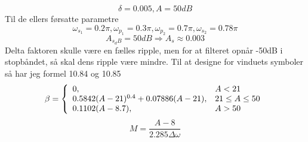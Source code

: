 \begin{Øvelser}
\begin{kapitel}
\begin{Øvelse}
            \[\delta = 0.005, A = 50dB\]
            Til de ellers førsatte parametre 
            \[\omega_{s_1} = 0.2\pi, \omega_{p_1} = 0.3\pi, \omega_{p_2} = 0.7\pi, \omega_{s_2} = 0.78\pi\]
            \[A_{s_dB}= 50dB \Rightarrow A_s \approx 0.003\]
            Delta faktoren skulle være en fælles ripple, men for at filteret opnår -50dB i stopbåndet, så skal dens ripple være mindre.
            Til at designe for vinduets symboler så har jeg formel 10.84 og 10.85
            \[\beta=\left\{\begin{array}{l l}{{0,}}&{{A<21}}\\ {{0.5842(A-21)^{0.4}+0.07886(A-21),}}&{{21\leq A\leq50}}\\ {{0.1102(A-8.7),}}&{{A>50}}\end{array}\right.\]
            \[M=\frac{A-8}{2.285\Delta\omega}\]
            

\end{Øvelse}
\end{kapitel}
\end{Øvelser}
